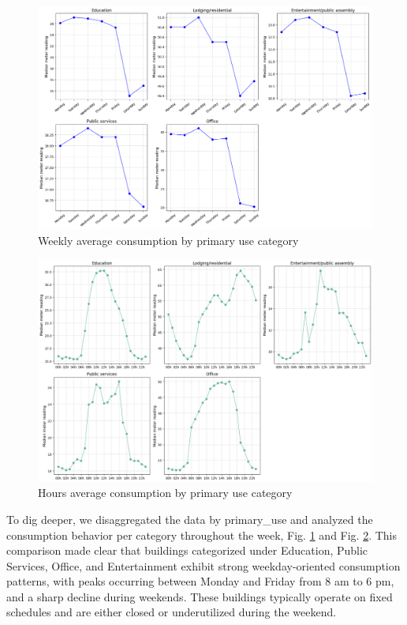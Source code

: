 \begin{figure}[!h] \centering \includegraphics[width=1\linewidth]{images/primary_use_weekly_patterns.png} \caption{Weekly average consumption by primary use category} \label{fig:WeeklyByPrimaryUse} \end{figure}
\begin{figure}[!h] \centering \includegraphics[width=1\linewidth]{images/primary_use_hours_patterns.png} \caption{Hours average consumption by primary use category} \label{fig:HoursByPrimaryUse} \end{figure}

To dig deeper, we disaggregated the data by primary\_use and analyzed the consumption behavior per category throughout the week, Fig. \ref{fig:WeeklyByPrimaryUse} and Fig. \ref{fig:HoursByPrimaryUse}. This comparison made clear that buildings categorized under Education, Public Services, Office, and Entertainment exhibit strong weekday-oriented consumption patterns, with peaks occurring between Monday and Friday from 8 am to 6 pm, and a sharp decline during weekends. These buildings typically operate on fixed schedules and are either closed or underutilized during the weekend.


